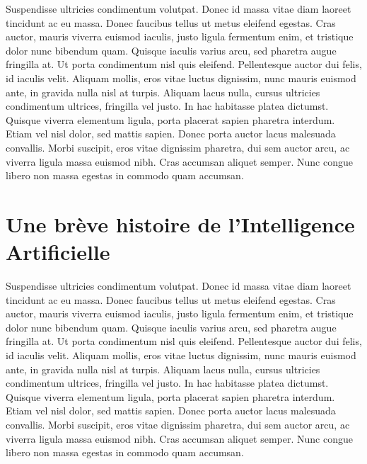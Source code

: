 Suspendisse ultricies condimentum volutpat. Donec id massa vitae diam laoreet tincidunt ac eu massa. Donec faucibus tellus ut metus eleifend egestas. Cras auctor, mauris viverra euismod iaculis, justo ligula fermentum enim, et tristique dolor nunc bibendum quam. Quisque iaculis varius arcu, sed pharetra augue fringilla at. Ut porta condimentum nisl quis eleifend. Pellentesque auctor dui felis, id iaculis velit. Aliquam mollis, eros vitae luctus dignissim, nunc mauris euismod ante, in gravida nulla nisl at turpis. Aliquam lacus nulla, cursus ultricies condimentum ultrices, fringilla vel justo. In hac habitasse platea dictumst. Quisque viverra elementum ligula, porta placerat sapien pharetra interdum. Etiam vel nisl dolor, sed mattis sapien. Donec porta auctor lacus malesuada convallis. Morbi suscipit, eros vitae dignissim pharetra, dui sem auctor arcu, ac viverra ligula massa euismod nibh. Cras accumsan aliquet semper. Nunc congue libero non massa egestas in commodo quam accumsan. 

\section{Une brève histoire de l'Intelligence Artificielle}

Suspendisse ultricies condimentum volutpat. Donec id massa vitae diam laoreet tincidunt ac eu massa. Donec faucibus tellus ut metus eleifend egestas. Cras auctor, mauris viverra euismod iaculis, justo ligula fermentum enim, et tristique dolor nunc bibendum quam. Quisque iaculis varius arcu, sed pharetra augue fringilla at. Ut porta condimentum nisl quis eleifend. Pellentesque auctor dui felis, id iaculis velit. Aliquam mollis, eros vitae luctus dignissim, nunc mauris euismod ante, in gravida nulla nisl at turpis. Aliquam lacus nulla, cursus ultricies condimentum ultrices, fringilla vel justo. In hac habitasse platea dictumst. Quisque viverra elementum ligula, porta placerat sapien pharetra interdum. Etiam vel nisl dolor, sed mattis sapien. Donec porta auctor lacus malesuada convallis. Morbi suscipit, eros vitae dignissim pharetra, dui sem auctor arcu, ac viverra ligula massa euismod nibh. Cras accumsan aliquet semper. Nunc congue libero non massa egestas in commodo quam accumsan. 